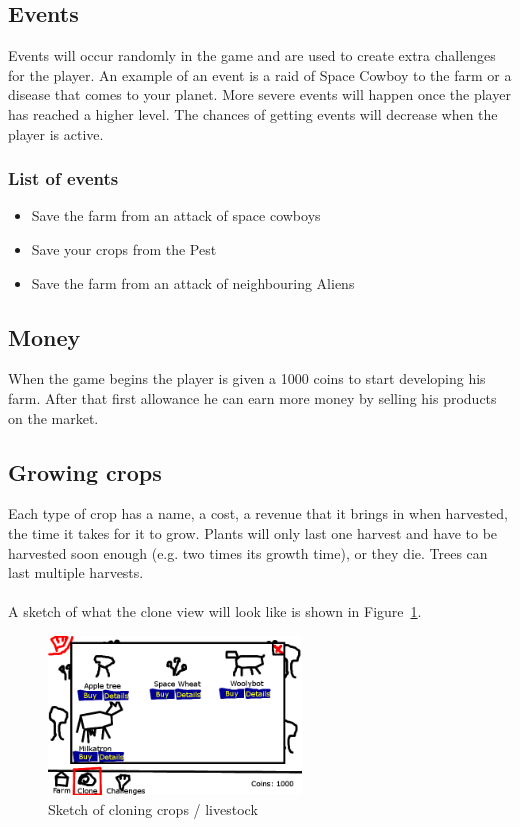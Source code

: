 \documentclass[a4paper,11pt,notitlepage]{report}
\begin{document}
\subsection{Events}
Events will occur randomly in the game and are used to create extra challenges for the player. An example of an event is a raid of Space Cowboy to the farm or a disease that comes to your planet. More severe events will happen once the player has reached a higher level. The chances of getting events will decrease when the player is active.
\subsubsection{List of events}
\begin{itemize}
\item Save the farm from an attack of space cowboys
\item Save your crops from the Pest
\item Save the farm from an attack of neighbouring Aliens
\end{itemize}
\subsection{Money}
When the game begins the player is given a 1000 coins to start developing his farm. After that first allowance he can earn more money by selling his products on the market.
\subsection{Growing crops}
Each type of crop has a name, a cost, a revenue that it brings in when harvested, the time it takes for it to grow. Plants will only last one harvest and have to be harvested soon enough (e.g. two times its growth time), or they die. Trees can last multiple harvests.
\\\\
A sketch of what the clone view will look like is shown in Figure~\ref{fig:sketch-clone}.

\begin{figure}[h]
	\centering
		\includegraphics[width=0.60\textwidth]{Images/sketch-clone.png}
	\caption{Sketch of cloning crops / livestock}
	\label{fig:sketch-clone}
\end{figure}
\end{document}
